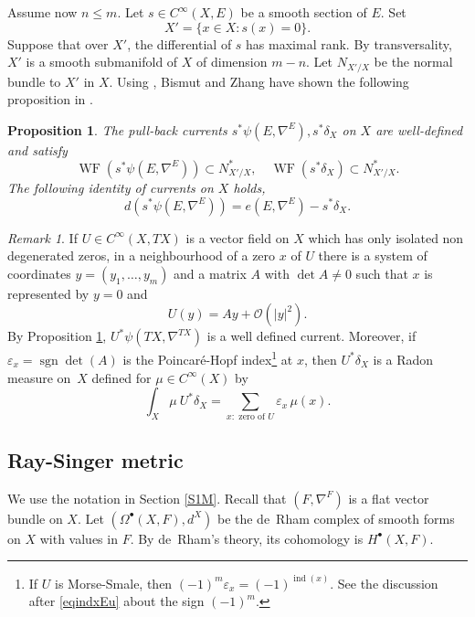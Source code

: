 \documentclass[JEP,XML,SOM,Unicode]{cedram}
\newcommand{\sbullet}{{\scriptscriptstyle\bullet}}
\let\mathcal\mathscr
\theoremstyle{plain}
\newtheorem{prop}[lem]{Proposition}
\theoremstyle{definition}
\theoremstyle{remark}
\newtheorem{re}[lem]{Remark}
\newcommand{\cO}{\mathcal{O}}
\DeclareMathOperator{\ind}{ind}
\DeclareMathOperator{\sgn}{sgn}
\DeclareMathOperator{\WF}{WF}
\let\l\leqslant
\let\e\varepsilon
\begin{document}
Assume now $n\l m$. Let $s\in C^{\infty}(X,E)$ be a smooth section of $E$. Set
\begin{equation}\label{eqX0}
X'=\{x\in X:s(x)=0\}.
\end{equation}
Suppose that over $X'$, the differential of $s$ has maximal rank. By transversality,
$X'$ is a smooth submanifold of $X$ of dimension $m-n$. Let $N_{X'/X}$ be the normal bundle to $X'$ in $X$. Using \cite[Th.\,8.2.4]{HormanderBook1}, Bismut and Zhang have shown the following proposition in \cite[Rem.\,3.8]{BZ92}.

\begin{prop}\label{PropBZ38}
The pull-back currents $s^{*}\psi(E,\nabla^{E}),
s^{*}\delta_{X}$ on $X$ are well-defined and satisfy
\begin{equation}\label{eqWFsd}
\WF(s^{*}\psi(E,\nabla^{E}))\subset N_{X'/X}^{*},\quad\WF(s^{*}\delta_{X})\subset N^{*}_{X'/X}.
\end{equation}
The following identity of currents on $X$ holds,
\begin{equation}\label{eqsphi}
d(s^{*}\psi(E,\nabla^{E}))=e(E,\nabla^{E})-s^{*}\delta_{X}.
\end{equation}
\end{prop}

\begin{re}\label{reBZ38}
If $U\in C^{\infty}(X,TX)$ is a vector field on $X$ which has only isolated non degenerated
zeros, \ie in a neighbourhood of a zero $x$ of $U$ there is a
system of coordinates $y=(y_{1},\ldots,y_{m})$ and a matrix
$A$ with $\det
A\neq0$ such that $x$ is represented by $y=0$ and
\begin{equation*}\label{eqU=Ay}
U(y)=Ay+\cO(|y|^{2}).
\end{equation*}
By Proposition \ref{PropBZ38}, $U^{*}\psi(TX,\nabla^{TX})$ is a well
defined current. Moreover, if $\e_{x}=\sgn\det(A)$ is the Poincaré-Hopf
index\footnote{If $U$ is Morse-Smale, then $(-1)^{m}\e_{x}=(-1)^{\ind(x)}.$ See the discussion
after \eqref{eqindxEu} about the sign $(-1)^{m}$.} at $x$, then
$U^{*}\delta_{X}$ is a Radon measure on~$X$ defined for $\mu\in
C^{\infty}(X)$ by
\begin{equation}\label{eqUindd}
\int_{X}\mu \ U^{*}\delta_{X}=\sum_{x:\text{ zero of }U}\e_{x}\,\mu(x).
\end{equation}
\end{re}

\subsection{Ray-Singer metric}\label{sRS}
We use the notation in Section \ref{S1M}. Recall that $(F,\nabla^{F})$ is a flat vector bundle on $X$.
Let $(\Omega^{\sbullet}(X,F),d^{X})$ be the de~Rham complex of smooth
forms on $X$ with values in
$F$. By de~Rham's theory, its cohomology is $H^{\sbullet}(X,F)$.
\end{document}
